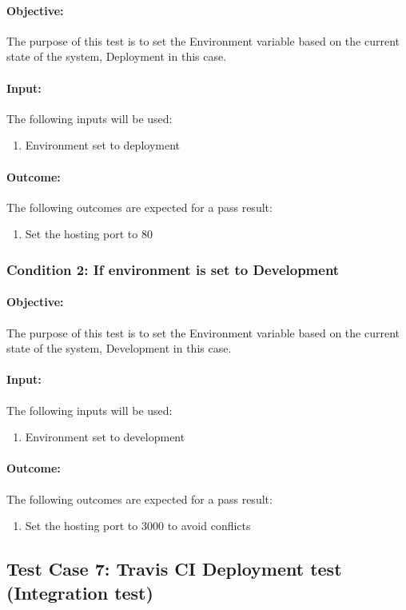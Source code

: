 \documentclass{article}
\begin{document}
\paragraph{Objective:} The purpose of this test is to set the Environment variable based on the current state of the system, Deployment in this case.
\paragraph{Input:} The following inputs will be used:
\begin{enumerate}
	\item Environment set to deployment
\end{enumerate}
\paragraph{Outcome:} The following outcomes are expected for a pass result:
\begin{enumerate}
	\item Set the hosting port to 80
\end{enumerate}
\subsubsection{Condition 2: If environment is set to Development }
\paragraph{Objective:} The purpose of this test is to set the Environment variable based on the current state of the system, Development in this case.
\paragraph{Input:} The following inputs will be used:
\begin{enumerate}
	\item Environment set to development
\end{enumerate}
\paragraph{Outcome:} The following outcomes are expected for a pass result:
\begin{enumerate}
	\item Set the hosting port to 3000 to avoid conflicts
\end{enumerate}

\subsection{Test Case 7: Travis CI Deployment test (Integration test) }\label{test7}
\end{document}
